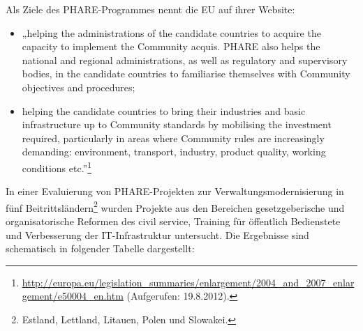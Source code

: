 Als Ziele des PHARE-Programmes nennt die EU auf ihrer Website:
\begin{itemize}
\item „helping the administrations of the candidate countries to acquire the capacity to implement the Community acquis. PHARE also helps the national and regional administrations, as well as regulatory and supervisory bodies, in the candidate countries to familiarise themselves with Community objectives and procedures;
\item helping the candidate countries to bring their industries and basic infrastructure up to Community standards by mobilising the investment required, particularly in areas where Community rules are increasingly demanding: environment, transport, industry, product quality, working conditions etc.”\footnote{\url{http://europa.eu/legislation_summaries/enlargement/2004_and_2007_enlargement/e50004_en.htm} (Aufgerufen: 19.8.2012).}
\end{itemize}
In einer Evaluierung von PHARE-Projekten zur Verwaltungsmodernisierung in fünf Beitrittsländern\footnote{Estland, Lettland, Litauen, Polen und Slowakei.} wurden Projekte aus den Bereichen gesetzgeberische und organisatorische Reformen des civil service, Training für öffentlich Bedienstete und Verbesserung der IT-Infrastruktur untersucht. Die Ergebnisse sind schematisch in folgender Tabelle dargestellt:
